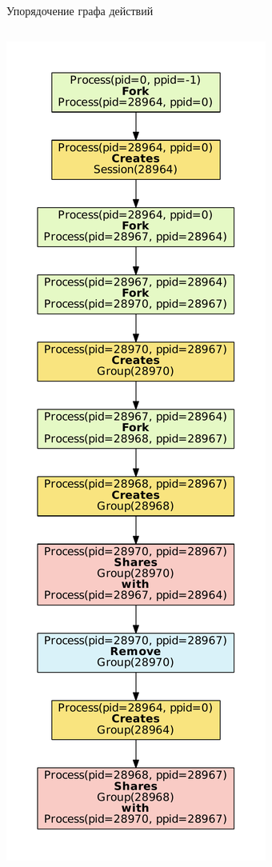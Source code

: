 \begin{frame}{Упорядочение графа действий}
\begin{columns}
\begin{column}{0.3\textwidth}
\begin{center}
     \includegraphics[scale=0.23]{fig/simpleGroupsGraphSorted.pdf}
     \end{center}
\end{column}
\end{columns}
\end{frame}

